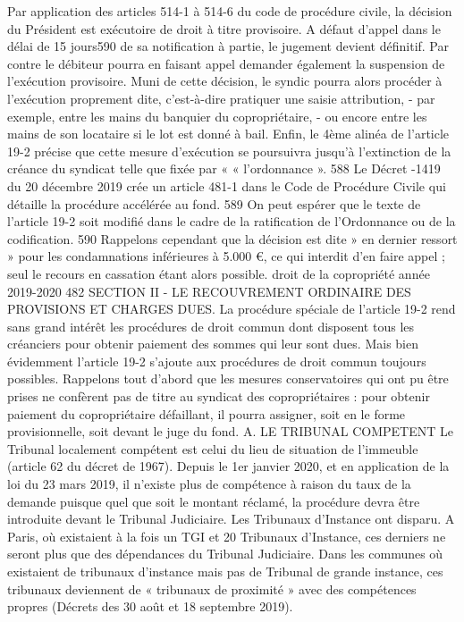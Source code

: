 Par application des articles 514-1 à 514-6 du code de procédure civile, la décision du Président est exécutoire de droit à titre provisoire.
A défaut d’appel dans le délai de 15 jours590 de sa notification à partie, le jugement devient définitif. Par contre le débiteur pourra en faisant appel demander également la suspension de l’exécution provisoire.
Muni de cette décision, le syndic pourra alors procéder à l'exécution proprement dite, c’est-à-dire pratiquer une saisie attribution,
- par exemple, entre les mains du banquier du copropriétaire,
- ou encore entre les mains de son locataire si le lot est donné à bail.
Enfin, le 4ème alinéa de l’article 19-2 précise que cette mesure d'exécution se poursuivra jusqu'à l'extinction de la créance du syndicat telle que fixée par « « l'ordonnance ».
588 Le Décret -1419 du 20 décembre 2019 crée un article 481-1 dans le Code de Procédure Civile qui détaille la procédure accélérée au fond.
589 On peut espérer que le texte de l’article 19-2 soit modifié dans le cadre de la ratification de l’Ordonnance ou de la codification.
590 Rappelons cependant que la décision est dite » en dernier ressort » pour les condamnations inférieures à 5.000 €, ce qui interdit d’en faire appel ; seul le recours en cassation étant alors possible.
droit de la copropriété année 2019-2020
482
SECTION II - LE RECOUVREMENT ORDINAIRE DES PROVISIONS ET CHARGES DUES.
La procédure spéciale de l’article 19-2 rend sans grand intérêt les procédures de droit commun dont disposent tous les créanciers pour obtenir paiement des sommes qui leur sont dues.
Mais bien évidemment l’article 19-2 s’ajoute aux procédures de droit commun toujours possibles.
Rappelons tout d’abord que les mesures conservatoires qui ont pu être prises ne confèrent pas de titre au syndicat des copropriétaires : pour obtenir paiement du copropriétaire défaillant, il pourra assigner, soit en le forme provisionnelle, soit devant le juge du fond.
A. LE TRIBUNAL COMPETENT
Le Tribunal localement compétent est celui du lieu de situation de l'immeuble (article 62 du décret de 1967).
Depuis le 1er janvier 2020, et en application de la loi du 23 mars 2019, il n’existe plus de compétence à raison du taux de la demande puisque quel que soit le montant réclamé, la procédure devra être introduite devant le Tribunal Judiciaire.
Les Tribunaux d’Instance ont disparu. A Paris, où existaient à la fois un TGI et 20 Tribunaux d’Instance, ces derniers ne seront plus que des dépendances du Tribunal Judiciaire. Dans les communes où existaient de tribunaux d’instance mais pas de Tribunal de grande instance, ces tribunaux deviennent de « tribunaux de proximité » avec des compétences propres (Décrets des 30 août et 18 septembre 2019).
